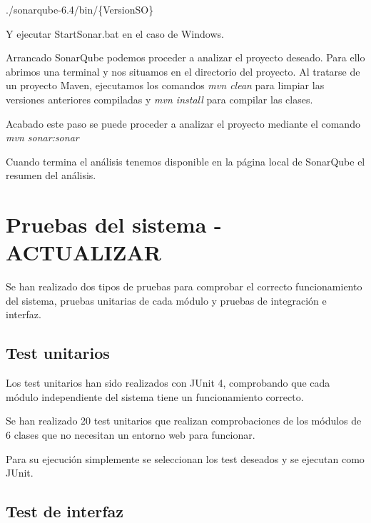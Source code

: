 ./sonarqube-6.4/bin/\{VersionSO\}

Y ejecutar StartSonar.bat en el caso de Windows.


Arrancado SonarQube podemos proceder a analizar el proyecto deseado. Para ello abrimos una terminal y nos situamos en el directorio del proyecto. Al tratarse de un proyecto Maven, ejecutamos los comandos \emph{mvn clean} para limpiar las versiones anteriores compiladas y \emph{mvn install} para compilar las clases.


Acabado este paso se puede proceder a analizar el proyecto mediante el comando \emph{mvn sonar:sonar}


Cuando termina el análisis tenemos disponible en la página local de SonarQube el resumen del análisis.


\section{Pruebas del sistema - ACTUALIZAR}

Se han realizado dos tipos de pruebas para comprobar el correcto funcionamiento del sistema, pruebas unitarias de cada módulo y pruebas de integración e interfaz.

\subsection{Test unitarios}

Los test unitarios han sido realizados con JUnit 4, comprobando que cada módulo independiente del sistema tiene un funcionamiento correcto.

Se han realizado 20 test unitarios que realizan comprobaciones de los módulos de 6 clases que no necesitan un entorno web para funcionar. 


Para su ejecución simplemente se seleccionan los test deseados y se ejecutan como JUnit.


\subsection{Test de interfaz}

